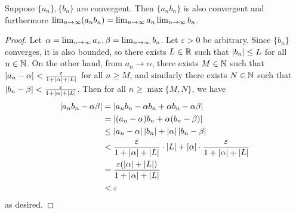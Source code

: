 \documentclass[main.tex]{subfiles}
\begin{document}
\begin{theorem}
    Suppose $\{a_n\}, \{b_n\}$ are convergent. Then $\{a_nb_n\}$ is also convergent and furthermore $\lim_{n\to \infty}(a_nb_n) = \lim_{n\to \infty} a_n \lim_{n\to \infty} b_n$.
\end{theorem}

\begin{proof}
    Let $\alpha = \lim_{n\to \infty} a_n, \beta = \lim_{n\to \infty} b_n$. Let $\varepsilon > 0$ be arbitrary. Since $\{b_n\}$ converges, it is also bounded, so there exists $L\in \mathbb R$ such that $\left\lvert b_n \right\rvert \le L$ for all $n\in \mathbb N$. On the other hand, from $a_n\to \alpha$, there exists $M\in \mathbb N$ such that $\left\lvert a_n - \alpha \right\rvert < \frac{\varepsilon}{1 + \left\lvert \alpha \right\rvert + \left\lvert L \right\rvert}$ for all $n\ge M$, and similarly there exists $N\in \mathbb N$ such that $\left\lvert b_n - \beta \right\rvert < \frac{\varepsilon}{1 + \left\lvert \alpha \right\rvert + \left\lvert L \right\rvert}$. Then for all $n\ge \max \{M, N\}$, we have
    \begin{align*}
        \left\lvert a_nb_n - \alpha\beta \right\rvert &= \left\lvert a_nb_n - \alpha b_n + \alpha b_n - \alpha\beta \right\rvert \\
        &= \left\lvert (a_n - \alpha)b_n + \alpha(b_n - \beta) \right\rvert \\
        &\le \left\lvert a_n - \alpha \right\rvert\left\lvert b_n \right\rvert + \left\lvert \alpha \right\rvert\left\lvert b_n - \beta \right\rvert \\
        &< \frac{\varepsilon}{1 + \left\lvert \alpha \right\rvert + \left\lvert L \right\rvert}\cdot \left\lvert L \right\rvert + \left\lvert \alpha \right\rvert\cdot \frac{\varepsilon}{1 + \left\lvert \alpha \right\rvert + \left\lvert L \right\rvert} \\
        &= \frac{\varepsilon(\left\lvert \alpha \right\rvert + \left\lvert L \right\rvert)}{1 + \left\lvert \alpha \right\rvert + \left\lvert L \right\rvert} \\
        &< \varepsilon
    \end{align*}
    as desired.
\end{proof}
\end{document}
